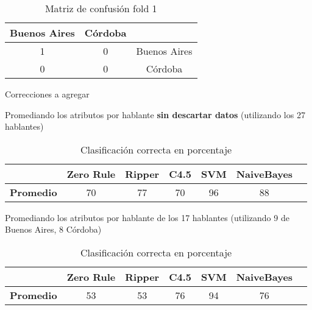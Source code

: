\begin{table}[H]
	\centering
	\begin{tabular}{|c|c|c|}
		\hline
		Buenos Aires & Córdoba & \\ \hline
		1 & 0 & Buenos Aires\\ \hline
		0 & 0 & Córdoba\\ \hline
	\end{tabular}
	\caption{Matriz de confusión fold 1}
	\label{PAH_mat_conf_f1_solo0o1}
\end{table}


Correcciones a agregar

	Promediando los atributos por hablante \textbf{sin descartar datos} (utilizando los 27 hablantes)
	
	{\small 	
		\begin{table}[H]
			\centering
			\begin{tabular}{|l|c|c|c|c|c|c|}
				\hline
				\textbf{}  & \textbf{Zero Rule} & \textbf{Ripper} & \textbf{C4.5} & \textbf{SVM} & \textbf{NaiveBayes} \\ \hline
				\textbf{Promedio} & 70  & 77 & 70 & 96 & 88 \\ \hline
			\end{tabular}
			\caption{Clasificación correcta en porcentaje}
			\label{HPTDT_clas_xval_porHab}
		\end{table}
	}
	
	Promediando los atributos por hablante de los 17 hablantes
	(utilizando 9 de Buenos Aires, 8 Córdoba)
	
	{\small 	
		\begin{table}[H]
			\centering
			\begin{tabular}{|l|c|c|c|c|c|c|}
				\hline
				\textbf{}  & \textbf{Zero Rule} & \textbf{Ripper} & \textbf{C4.5} & \textbf{SVM} & \textbf{NaiveBayes} \\ \hline
				\textbf{Promedio} & 53  & 53 & 76 & 94 & 76 \\ \hline
			\end{tabular}
			\caption{Clasificación correcta en porcentaje}
			\label{HPTDT_clas_xval_porHab}
		\end{table}
	}

